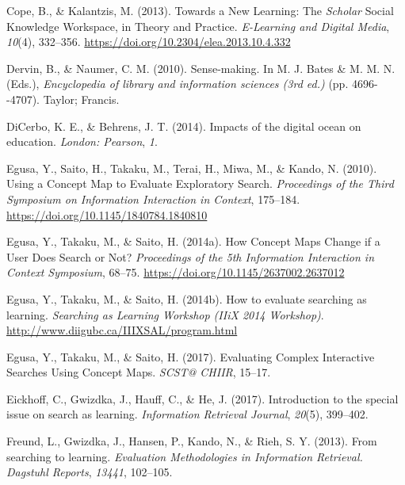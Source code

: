 \documentclass[letterpaper, nobind]{templates/ociamthesis}
\newlength{\cslhangindent}
\newenvironment{CSLReferences}[2] %
 {%
  \setlength{\parindent}{0pt}
  \ifodd #1
  \let\oldpar\par
  \def\par{\hangindent=\cslhangindent\oldpar}
  \fi
  \setlength{\parskip}{1mm}
  \setlength{\baselineskip}{6mm}
 }%
 {}
\begin{document}
\begin{CSLReferences}{1}{0}
\leavevmode{}%
Cope, B., \& Kalantzis, M. (2013). Towards a {New Learning}: The {\emph{Scholar}} {Social Knowledge Workspace}, in {Theory} and {Practice}. \emph{E-Learning and Digital Media}, \emph{10}(4), 332--356. \url{https://doi.org/10.2304/elea.2013.10.4.332}

\leavevmode{}%
Dervin, B., \& Naumer, C. M. (2010). Sense-making. In M. J. Bates \& M. M. N. (Eds.), \emph{Encyclopedia of library and information sciences (3rd ed.)} (pp. 4696-\/-4707). Taylor; Francis.

\leavevmode{}%
DiCerbo, K. E., \& Behrens, J. T. (2014). Impacts of the digital ocean on education. \emph{London: Pearson}, \emph{1}.

\leavevmode{}%
Egusa, Y., Saito, H., Takaku, M., Terai, H., Miwa, M., \& Kando, N. (2010). Using a {Concept Map} to {Evaluate Exploratory Search}. \emph{Proceedings of the {Third Symposium} on {Information Interaction} in {Context}}, 175--184. \url{https://doi.org/10.1145/1840784.1840810}

\leavevmode{}%
Egusa, Y., Takaku, M., \& Saito, H. (2014a). How {Concept Maps Change} if a {User Does Search} or {Not}? \emph{Proceedings of the 5th {Information Interaction} in {Context Symposium}}, 68--75. \url{https://doi.org/10.1145/2637002.2637012}

\leavevmode{}%
Egusa, Y., Takaku, M., \& Saito, H. (2014b). How to evaluate searching as learning. \emph{Searching as {Learning Workshop} ({IIiX} 2014 Workshop)}. \url{http://www.diigubc.ca/IIIXSAL/program.html}

\leavevmode{}%
Egusa, Y., Takaku, M., \& Saito, H. (2017). Evaluating {Complex Interactive Searches Using Concept Maps}. \emph{{SCST}@ {CHIIR}}, 15--17.

\leavevmode{}%
Eickhoff, C., Gwizdka, J., Hauff, C., \& He, J. (2017). Introduction to the special issue on search as learning. \emph{Information Retrieval Journal}, \emph{20}(5), 399--402.

\leavevmode{}%
Freund, L., Gwizdka, J., Hansen, P., Kando, N., \& Rieh, S. Y. (2013). From searching to learning. \emph{Evaluation Methodologies in Information Retrieval. Dagstuhl Reports}, \emph{13441}, 102--105.


\end{CSLReferences}
\end{document}
